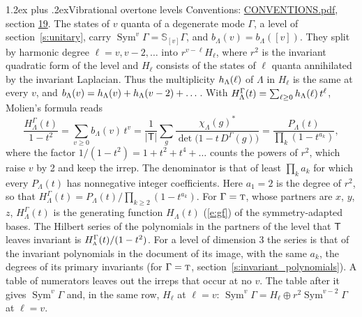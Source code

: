 \documentclass[10pt,a4paper]{article}
\makeatletter
\renewcommand\section{\@startsection{section}{1}{\z@}{-3ex plus -1ex minus -.2ex}%
  {1.2ex plus .2ex}{\normalfont\large\sffamily\bfseries\color{parttitle}}}
\numberwithin{equation}{section}
\newcommand{\grp}[1]{\mathsf{#1}}
\newcommand{\irr}[1]{\text{\normalfont\scshape #1}}
\newcommand{\repD}[1]{D^{#1}}
\newcommand{\irchar}[1]{\chi_{#1}}
\newcommand{\conj}[1]{{#1}^{*}}
\newcommand{\schur}[1]{\mathbb{S}_{#1}}
\newcommand{\shape}[1]{[#1]}
\makeatother
\begin{document}
\section{Vibrational overtone levels}\label{s:overtones}
Conventions: \href{../../CONVENTIONS.pdf}{CONVENTIONS.pdf}, section \href{../../CONVENTIONS.pdf\#conv.19}{19}.
\leavevmode\label{n:index.quanta}\label{n:operator.symmetric.power}The states of $v$ quanta of a degenerate mode $\Gamma$, a level of section~\ref{s:unitary}, carry $\operatorname{Sym}^{v}\Gamma = \schur{\shape{v}}\Gamma$, and $b_\Lambda(v) = b_\Lambda(\shape{v})$. \label{n:local.quadratic.form}\label{n:set.harmonic}They split by harmonic degree $\ell = v, v - 2, \dots$ into $r^{v-\ell}H_\ell$, where $r^2$ is the invariant quadratic form of the level and $H_\ell$ consists of the states of $\ell$ quanta annihilated by the invariant Laplacian. \label{n:function.multiplicity.harmonic}Thus the multiplicity $\mathnormal{h}_\Lambda(\ell)$ of $\Lambda$ in $H_\ell$ is the same at every $v$, and $b_\Lambda(v) = \mathnormal{h}_\Lambda(v) + \mathnormal{h}_\Lambda(v - 2) + \dots$. \label{n:function.generating.level}With $H^{\Gamma}_\Lambda(t) = \sum_{\ell\ge0} \mathnormal{h}_\Lambda(\ell)\,t^{\ell}$, Molien's formula reads
\begin{equation}\label{e:molien}\frac{H^{\Gamma}_\Lambda(t)}{1 - t^2} = \sum_{v\ge0} b_\Lambda(v)\,t^v = \frac{1}{|\grp{T}|}\sum_{g}\frac{\conj{\irchar{\Lambda}(g)}}{\det\bigl(1 - t\,\repD{\Gamma}(g)\bigr)} = \frac{P_\Lambda(t)}{\prod_k (1-t^{a_k})},\end{equation}
where the factor $1/(1 - t^2) = 1 + t^2 + t^4 + \dots$ counts the powers of $r^2$, which raise $v$ by 2 and keep the irrep. The denominator is that of least $\prod_k a_k$ for which every $P_\Lambda(t)$ has nonnegative integer coefficients. Here $a_1 = 2$ is the degree of $r^2$, so that $H^{\Gamma}_\Lambda(t) = P_\Lambda(t)/\prod_{k\ge2}(1 - t^{a_k})$. For $\Gamma = \irr{t}$, whose partners are $x$, $y$, $z$, $H^{\Gamma}_\Lambda(t)$ is the generating function $H_\Lambda(t)$ (\ref{e:gf}) of the symmetry-adapted bases. The Hilbert series of the polynomials in the partners of the level that $\grp{T}$ leaves invariant is $H^{\Gamma}_{\irr{a}}(t)/(1 - t^2)$. For a level of dimension 3 the series is that of the invariant polynomials in the document of its image, with the same $a_k$, the degrees of its primary invariants (for $\Gamma = \irr{t}$, section~\ref{s:invariant_polynomials}). A table of numerators leaves out the irreps that occur at no $v$. The table after it gives $\operatorname{Sym}^{v}\Gamma$ and, in the same row, $H_\ell$ at $\ell = v$: $\operatorname{Sym}^{v}\Gamma = H_\ell \oplus r^2\operatorname{Sym}^{v-2}\Gamma$ at $\ell = v$.
\end{document}
